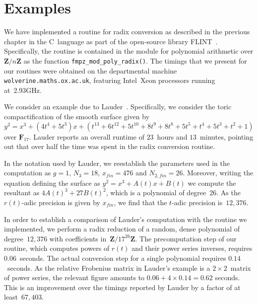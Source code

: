 
\chapter{Examples}
\label{ch:02-Exmp}

We have implemented a routine for radix conversion as described 
in the previous chapter in the C~language as part of the open-source 
library FLINT~\citep{FLINT}.  Specifically, the routine is contained 
in the module for polynomial arithmetic over $\mathbf{Z}/n\mathbf{Z}$ 
as the function {\tt{fmpz\_mod\_poly\_radix()}}.  The timings that we 
present for our routines were obtained on the departmental machine 
{\tt{wolverine.maths.ox.ac.uk}}, featuring \mbox{Intel Xeon} processors 
running at~2.93GHz.

We consider an example due to Lauder~\citep[Example~9.1]{Lauder2006}.  
Specifically, we consider the toric compactification of the smooth 
surface given by 
\begin{equation*}
y^2 = x^3 + (4 t^4 + 5 t^3) x + 
    (t^{13} + 6 t^{12} + 5 t^{10} + 
    8 t^9 + 8 t^8 + 5 t^5 + t^4 + 5 t^3 + t^2 + 1)
\end{equation*}
over $\mathbf{F}_{17}$.  Lauder reports an overall runtime 
of $23$~hours and $13$~minutes, pointing out that over half the 
time was spent in the radix conversion routine.

In the notation used by Lauder, we reestablish the parameters used 
in the computation as $g = 1$, $N_3 = 18$, $x_{fin} = 476$ and 
$N_{2,fin} = 26$.  Moreover, writing the equation defining the surface 
as $y^2 = x^3 + A(t) x + B(t)$ we compute the resultant as 
$4 A(t)^3 + 27 B(t)^2$, which is a polynomial of degree~$26$.  As the 
$r(t)$-adic precision is given by $x_{fin}$, we find that the $t$-adic 
precision is~$12,376$.

In order to establish a comparison of Lauder's computation with the 
routine we implemented, we perform a radix reduction of a random, 
dense polynomial of degree~$12,376$ with coefficients 
in~$\mathbf{Z}/17^{26} \mathbf{Z}$.  The precomputation step of our 
routine, which computes powers of $r(t)$ and their power series 
inverses, requires $0.06$~seconds.  The actual conversion step for a 
single polynomial requires $0.14$~seconds.  As the relative Frobenius 
matrix in Lauder's example is a $2 \times 2$~matrix of power series, 
the relevant figure amounts to $0.06 + 4 \times 0.14 = 0.62$ seconds. 
This is an improvement over the timings reported by Lauder by a 
factor of at least~$67,403$.

